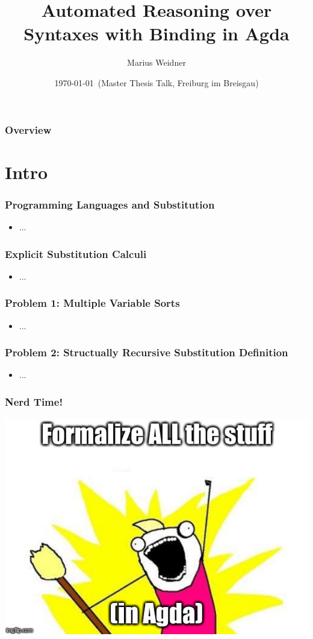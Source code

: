 \documentclass[dvipsnames,aspectratio=169,pdftex]{beamer}
\title{Automated Reasoning over Syntaxes with Binding in Agda}
\author{Marius Weidner}
\institute{University of Freiburg}
\date{\today \ (Master Thesis Talk, Freiburg im Breisgau)}
\begin{document}
\begin{frame}{\null}
  \titlepage 
\end{frame}

\begin{frame}[fragile]
  \frametitle{Overview}
  \tableofcontents
\end{frame}

\section{Intro}

\begin{frame}[fragile]
  \frametitle{Programming Languages and Substitution}
  \begin{itemize}
    \item ...
  \end{itemize}
\end{frame}

\begin{frame}[fragile]
  \frametitle{Explicit Substitution Calculi}
  \begin{itemize}
    \item ...
  \end{itemize}
\end{frame}

\begin{frame}[fragile]
  \frametitle{Problem 1: Multiple Variable Sorts}
  \begin{itemize}
    \item ...
  \end{itemize}
\end{frame}

\begin{frame}[fragile]
  \frametitle{Problem 2: Structually Recursive Substitution Definition}
  \begin{itemize}
    \item ...
  \end{itemize}
\end{frame}

\begin{frame}[fragile]
  \frametitle{Nerd Time!}
  \begin{center}
    \includegraphics[height=0.9\textheight]{image.png}
  \end{center}
\end{frame}
\end{document}
